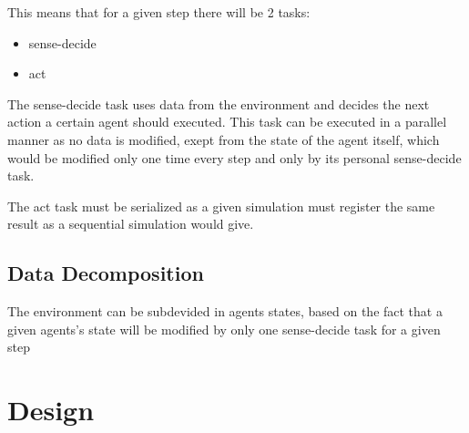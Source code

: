 \documentclass[12pt, a4paper]{report}
\begin{document}
This means that for a given step there will be 2 tasks:
\begin{itemize}
    \item sense-decide
    \item act
\end{itemize}

The sense-decide task uses data from the environment and decides
 the next action a certain agent should executed. This task can
 be executed in a parallel manner as no data is modified, exept
 from the state of the agent itself, which would be modified only
 one time every step and only by its personal sense-decide task.

The act task must be serialized as a given simulation must register
 the same result as a sequential simulation would give.

\section{Data Decomposition}
The environment can be subdevided in agents states, based
 on the fact that a given agents's state will be modified
 by only one sense-decide task for a given step

\chapter{Design}



\end{document}
